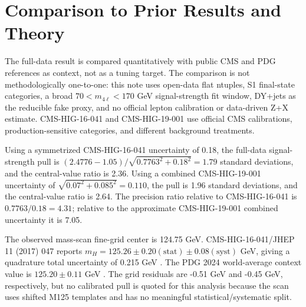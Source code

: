 \documentclass[11pt]{article}
\begin{document}
\section{Comparison to Prior Results and Theory}
The full-data result is compared quantitatively with public CMS and PDG references as context, not as a tuning target. The comparison is not methodologically one-to-one: this note uses open-data flat ntuples, S1 final-state categories, a broad $70 < m_{4\ell} < 170$ GeV signal-strength fit window, DY+jets as the reducible fake proxy, and no official lepton calibration or data-driven Z+X estimate. CMS-HIG-16-041 and CMS-HIG-19-001 use official CMS calibrations, production-sensitive categories, and different background treatments.

Using a symmetrized CMS-HIG-16-041 uncertainty of 0.18, the full-data signal-strength pull is $(2.4776-1.05)/\sqrt{0.7763^2+0.18^2}=1.79$ standard deviations, and the central-value ratio is 2.36. Using a combined CMS-HIG-19-001 uncertainty of $\sqrt{0.07^2+0.085^2}=0.110$, the pull is 1.96 standard deviations, and the central-value ratio is 2.64. The precision ratio relative to CMS-HIG-16-041 is $0.7763/0.18=4.31$; relative to the approximate CMS-HIG-19-001 combined uncertainty it is 7.05.

The observed mass-scan fine-grid center is 124.75 GeV. CMS-HIG-16-041/JHEP 11 (2017) 047 reports $m_H=125.26\pm0.20\mathrm{(stat)}\pm0.08\mathrm{(syst)}$ GeV, giving a quadrature total uncertainty of 0.215 GeV \cite{CMS-HIG-16-041}. The PDG 2024 world-average context value is $125.20\pm0.11$ GeV \cite{PDG2024}. The grid residuals are -0.51 GeV and -0.45 GeV, respectively, but no calibrated pull is quoted for this analysis because the scan uses shifted M125 templates and has no meaningful statistical/systematic split.
\end{document}
